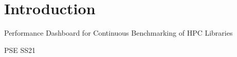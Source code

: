 \section{Introduction}

Performance Dashboard for Continuous Benchmarking of HPC Libraries

PSE SS21